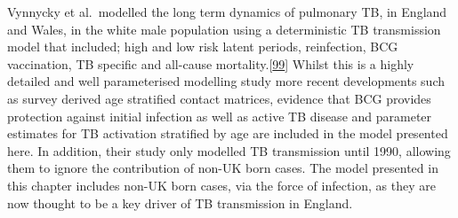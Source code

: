 \documentclass[11pt,twoside]{bristolthesis}
\begin{document}
  Vynnycky et al.~modelled the long term dynamics of pulmonary TB, in England and Wales, in the white male population using a deterministic TB transmission model that included; high and low risk latent periods, reinfection, BCG vaccination, TB specific and all-cause mortality.{[}\protect\hyperlink{ref-Vynnycky1997a}{99}{]} Whilst this is a highly detailed and well parameterised modelling study more recent developments such as survey derived age stratified contact matrices, evidence that BCG provides protection against initial infection as well as active TB disease and parameter estimates for TB activation stratified by age are included in the model presented here. In addition, their study only modelled TB transmission until 1990, allowing them to ignore the contribution of non-UK born cases. The model presented in this chapter includes non-UK born cases, via the force of infection, as they are now thought to be a key driver of TB transmission in England.
  
\end{document}
